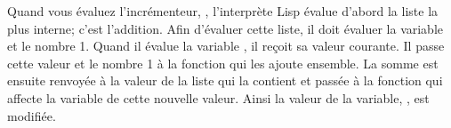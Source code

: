Quand vous évaluez l'incrémenteur, ,
l'interprète Lisp évalue d'abord la liste la plus interne; c'est
l'addition. Afin d'évaluer cette liste, il doit évaluer la variable
 et le nombre 1. Quand il évalue la variable ,
il reçoit sa valeur courante. Il passe cette valeur et le nombre 1 à
la fonction \tm{+} qui les ajoute ensemble. La somme est ensuite
renvoyée à la valeur de la liste qui la contient et passée à la
fonction  qui affecte la variable  de cette
nouvelle valeur. Ainsi la valeur de la variable, , est modifiée.

